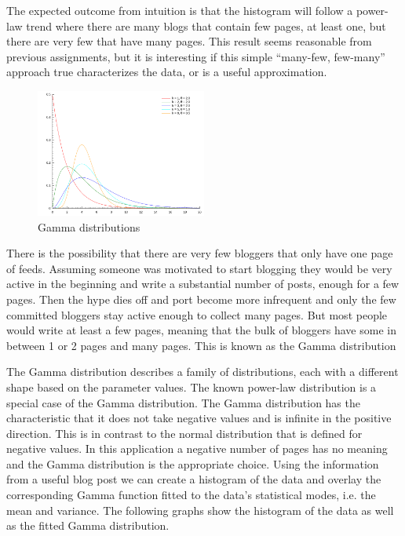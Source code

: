 

The expected outcome from intuition is that the histogram will follow a power-law trend where there are many blogs that contain few pages, at least one, but there are very few that have many pages. This result seems reasonable from previous assignments, but it is interesting if this simple ``many-few, few-many'' approach true characterizes the data, or is a useful approximation. 

\begin{figure}
  \vspace{-20pt}
  \begin{center}
    \includegraphics[width=0.5\textwidth]{gamma}
  \end{center}
  \vspace{-20pt}
  \caption{Gamma distributions}
  \vspace{-10pt}
\end{figure}



There is the possibility that there are very few bloggers that only have one page of feeds. Assuming someone was motivated to start blogging they would be very active in the beginning and write a substantial number of posts, enough for a few pages. Then the hype dies off and port become more infrequent and only the few committed bloggers stay active enough to collect many pages. But most people would write at least a few pages, meaning that the bulk of bloggers have some in between 1 or 2 pages and many pages. This is known as the Gamma distribution

The Gamma distribution describes a family of distributions, each with a different shape based on the parameter values. The known power-law distribution is a special case of the Gamma distribution. The Gamma distribution has the characteristic that it does not take negative values and is infinite in the positive direction. This is in contrast to the normal distribution that is defined for negative values. In this application a negative number of pages has no meaning and the Gamma distribution is the appropriate choice. Using the information from a useful blog post \cite{Rplots} we can create a histogram of the data and overlay the corresponding Gamma function fitted to the data's statistical modes, i.e. the mean and variance.
The following graphs show the histogram of the data as well as the fitted Gamma distribution.


